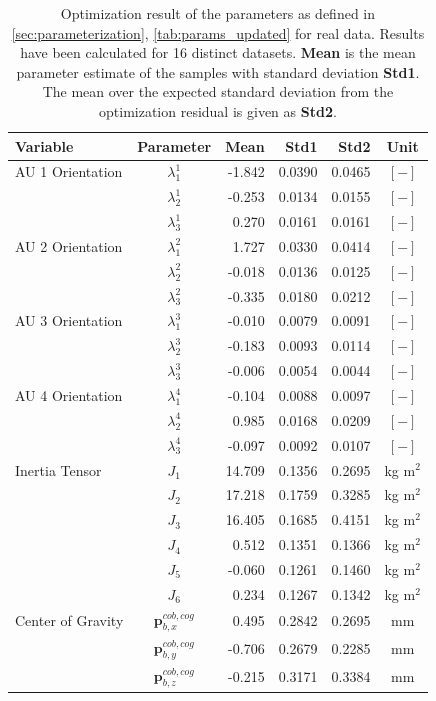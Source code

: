 \newpage

\vspace*{\fill}
\begin{table}[H]
\captionsetup{width=0.9\textwidth}
\centering
\caption{Optimization result of the parameters as defined in \cref{sec:parameterization}, \cref{tab:params_updated} for real data. Results have been calculated for 16 distinct datasets. \textbf{Mean} is the mean parameter estimate of the samples with standard deviation \textbf{Std1}. The mean over the expected standard deviation from the optimization residual is given as \textbf{Std2}. }
\begin{tabular}{lcrrrc}
Variable & Parameter & Mean & Std1 & Std2 & Unit \\
\hline \hline
AU 1 Orientation & $\lambda_1^1$ & -1.842 & 0.0390 & 0.0465 & $[-]$ \\
                 & $\lambda_2^1$ & -0.253 & 0.0134 & 0.0155 & $[-]$ \\
                 & $\lambda_3^1$ &  0.270 & 0.0161 & 0.0161 & $[-]$ \\
AU 2 Orientation & $\lambda_1^2$ &  1.727 & 0.0330 & 0.0414 & $[-]$ \\
                 & $\lambda_2^2$ & -0.018 & 0.0136 & 0.0125 & $[-]$ \\
                 & $\lambda_3^2$ & -0.335 & 0.0180 & 0.0212 & $[-]$ \\
AU 3 Orientation & $\lambda_1^3$ & -0.010 & 0.0079 & 0.0091 & $[-]$ \\
                 & $\lambda_2^3$ & -0.183 & 0.0093 & 0.0114 & $[-]$ \\
                 & $\lambda_3^3$ & -0.006 & 0.0054 & 0.0044 & $[-]$ \\
AU 4 Orientation & $\lambda_1^4$ & -0.104 & 0.0088 & 0.0097 & $[-]$ \\
                 & $\lambda_2^4$ &  0.985 & 0.0168 & 0.0209 & $[-]$ \\
                 & $\lambda_3^4$ & -0.097 & 0.0092 & 0.0107 & $[-]$ \\
\hline
Inertia Tensor & $J_1$ & 14.709 & 0.1356 & 0.2695 & kg m$^2$ \\
               & $J_2$ & 17.218 & 0.1759 & 0.3285 & kg m$^2$ \\
               & $J_3$ & 16.405 & 0.1685 & 0.4151 & kg m$^2$ \\
               & $J_4$ &  0.512 & 0.1351 & 0.1366 & kg m$^2$ \\
               & $J_5$ & -0.060 & 0.1261 & 0.1460 & kg m$^2$ \\
               & $J_6$ &  0.234 & 0.1267 & 0.1342 & kg m$^2$ \\
\hline
Center of Gravity & $\mathbf{p}_{b,x}^{cob,cog}$ &  0.495 & 0.2842 & 0.2695 & mm \\
                  & $\mathbf{p}_{b,y}^{cob,cog}$ & -0.706 & 0.2679 & 0.2285 & mm \\
                  & $\mathbf{p}_{b,z}^{cob,cog}$ & -0.215 & 0.3171 & 0.3384 & mm \\
\hline
\end{tabular}
\end{table}
\vspace*{\fill}